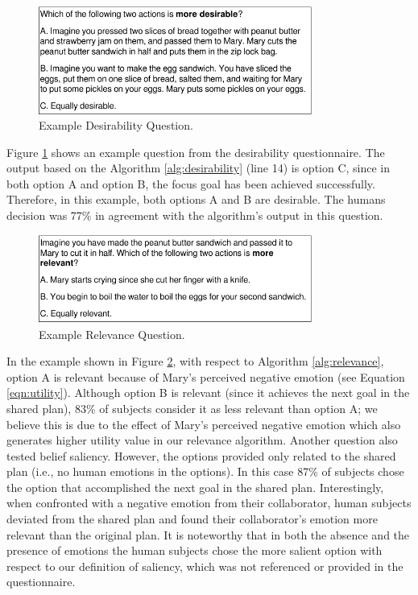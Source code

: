 \begin{figure}[t]
  \vspace{-1mm}
  \centering
  \includegraphics[width=0.8\textwidth]{figure/question-sample3-croped.pdf}
  \caption{{\fontsize{9}{9}\selectfont Example Desirability Question.}}
  \label{fig:qs3}
  \vspace{-2mm}
\end{figure}

Figure \ref{fig:qs3} shows an example question from the desirability
questionnaire. The output based on the Algorithm \ref{alg:desirability}
(line 14) is option C, since in both option A and option B, the focus goal
has been achieved successfully. Therefore, in this example, both options A and B
are desirable. The humans decision was 77\% in agreement with the algorithm's
output in this question.

\begin{figure}[tbh]
  \vspace{-1mm}
  \centering
  \includegraphics[width=0.8\textwidth]{figure/question-sample4-croped.pdf}
  \caption{{\fontsize{9}{9}\selectfont Example Relevance Question.}}
  \label{fig:qs4}
  \vspace{-2mm}
\end{figure}

In the example shown in Figure \ref{fig:qs4}, with respect to Algorithm
\ref{alg:relevance}, option A is relevant because of Mary's perceived negative
emotion (see Equation \ref{eqn:utility}). Although option B is relevant (since
it achieves the next goal in the shared plan), 83\% of subjects consider it as
less relevant than option A; we believe this is due to the effect of Mary's
perceived negative emotion which also generates higher utility value in our
relevance algorithm. Another question also tested belief saliency. However, the
options provided only related to the shared plan (i.e., no human emotions in the
options). In this case 87\% of subjects chose the option that accomplished the
next goal in the shared plan. Interestingly, when confronted with a negative
emotion from their collaborator, human subjects deviated from the shared plan
and found their collaborator's emotion more relevant than the original plan. It
is noteworthy that in both the absence and the presence of emotions the human
subjects chose the more salient option with respect to our definition of
saliency, which was not referenced or provided in the questionnaire.

